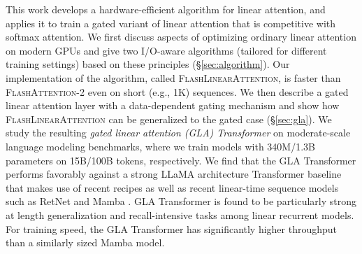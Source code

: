 This work develops a hardware-efficient algorithm for linear attention, and applies it to train a gated variant of linear attention that is competitive with softmax attention. We first discuss  aspects of optimizing ordinary linear attention on modern GPUs  and give two I/O-aware algorithms (tailored for different training settings) based on these principles (\S\ref{sec:algorithm}). Our implementation of the algorithm, called \textsc{FlashLinearAttention}, is faster than \textsc{FlashAttention-2} \citep{flashattention2} even on short (e.g., 1K) sequences. 
We then describe a gated linear attention layer with a data-dependent gating mechanism and show how \textsc{FlashLinearAttention} can be generalized to the gated case (\S\ref{sec:gla}). 
We study the resulting \emph{gated linear attention (GLA) Transformer} on moderate-scale language modeling benchmarks, where we train models with 340M/1.3B parameters on 15B/100B tokens, respectively. We find that the GLA Transformer performs favorably against a strong LLaMA architecture Transformer baseline that makes use of recent recipes \citep[Transformer++;][]{touvron2023llama} as well as recent linear-time sequence models such as RetNet \cite{sun2023retentive} and Mamba \citep{Gu2023MambaLS}. GLA Transformer is found to be particularly strong at length generalization and recall-intensive tasks among linear recurrent models. For training speed,  the GLA Transformer has significantly  higher throughput than a similarly sized Mamba model.
%
